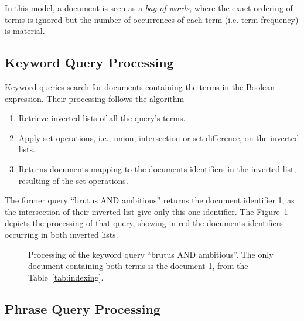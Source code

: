In this model, a document is seen as a \emph{bag of words}, where the exact
ordering of terms is ignored but the number of occurrences of each term (i.e.
term frequency) is material.

\subsection{Keyword Query Processing}

Keyword queries search for documents containing the terms in the Boolean
expression. Their processing follows the algorithm
\begin{enumerate}
  \item Retrieve inverted lists of all the query's terms.
  \item Apply set operations, i.e., union, intersection or set difference, on the
  inverted lists.
  \item Returns documents mapping to the documents identifiers in the inverted
  list, resulting of the set operations.
\end{enumerate}
The former query ``brutus AND ambitious'' returns the document identifier 1, as
the intersection of their inverted list give only this one identifier. The
Figure~\ref{fig:KWquery} depicts the processing of that query, showing in red
the documents identifiers occurring in both inverted lists.

\begin{figure}
\centering
{}%
\caption{Processing of the keyword query ``brutus AND ambitious''. The only
document containing both terms is the document 1, from the
Table~\ref{tab:indexing}.}
\label{fig:KWquery}
\end{figure}

\subsection{Phrase Query Processing}

